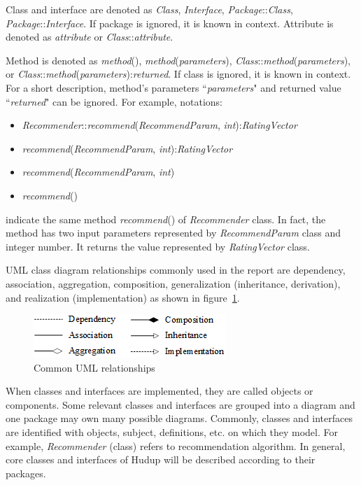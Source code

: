 \documentclass[a4paper,twoside]{article}
\begin{document}
Class and interface are denoted as \textit{Class}, \textit{Interface}, \textit{Package}::\textit{Class}, \textit{Package}::\textit{Interface}. If package is ignored, it is known in context. Attribute is denoted as \textit{attribute} or \textit{Class}::\textit{attribute}.

Method is denoted as \textit{method}(), \textit{method}(\textit{parameters}), \textit{Class}::\textit{method}(\textit{parameters}), or \textit{Class}::\textit{method}(\textit{parameters}):\textit{returned}. If class is ignored, it is known in context. For a short description, method's parameters ``\textit{parameters}" and returned value ``\textit{returned}" can be ignored. For example, notations:
\begin{itemize}
\item \textit{Recommender}::\textit{recommend}(\textit{RecommendParam}, \textit{int}):\textit{RatingVector}
\item \textit{recommend}(\textit{RecommendParam}, \textit{int}):\textit{RatingVector}
\item \textit{recommend}(\textit{RecommendParam}, \textit{int})
\item \textit{recommend}()
\end{itemize}
indicate the same method \textit{recommend}() of \textit{Recommender} class. In fact, the method has two input parameters represented by \textit{RecommendParam} class and integer number. It returns the value represented by \textit{RatingVector} class.

UML class diagram relationships commonly used in the report are dependency, association, aggregation, composition, generalization (inheritance, derivation), and realization (implementation) as shown in figure~\ref{figure:uml-relationships}.
\begin{figure}
\centering
\includegraphics{UMLRelationships.png}
\caption{Common UML relationships}
\label{figure:uml-relationships}
\end{figure}

When classes and interfaces are implemented, they are called objects or components. Some relevant classes and interfaces are grouped into a diagram and one package may own many possible diagrams. Commonly, classes and interfaces are identified with objects, subject, definitions, etc. on which they model. For example, \textit{Recommender} (class) refers to recommendation algorithm. In general, core classes and interfaces of Hudup will be described according to their packages.
\end{document}
